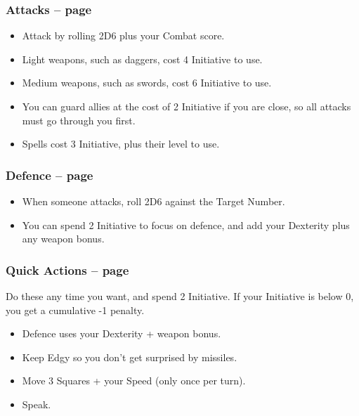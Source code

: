 \begin{multicols}{2}
\begin{itemize}
\end{itemize}

\subsubsection{Attacks -- page \pageref{attack}}

\begin{itemize}

  \item{Attack by rolling 2D6 plus your Combat score.}
  \item{Light weapons, such as daggers, cost 4 Initiative to use.}
  \item{Medium weapons, such as swords, cost 6 Initiative to use.}
  \item{You can guard allies at the cost of 2 Initiative if you are close, so all attacks must go through you first.}
  \item{Spells cost 3 Initiative, plus their level to use.}

\end{itemize}

\subsubsection{Defence -- page \pageref{defence}}

\begin{itemize}

  \item{When someone attacks, roll 2D6 against the Target Number.}
  \item{You can spend 2 Initiative to focus on defence, and add your Dexterity plus any weapon bonus.}

\end{itemize}

\subsubsection{Quick Actions -- page \pageref{quickaction}}

Do these any time you want, and spend 2 Initiative.
If your Initiative is below 0, you get a cumulative -1 penalty.

\begin{itemize}

  \item{Defence uses your Dexterity + weapon bonus.}
  \item{Keep Edgy so you don't get surprised by missiles.}
  \item{Move 3 Squares + your Speed (only once per turn).}
  \item{Speak.}


\end{itemize}
\end{multicols}
